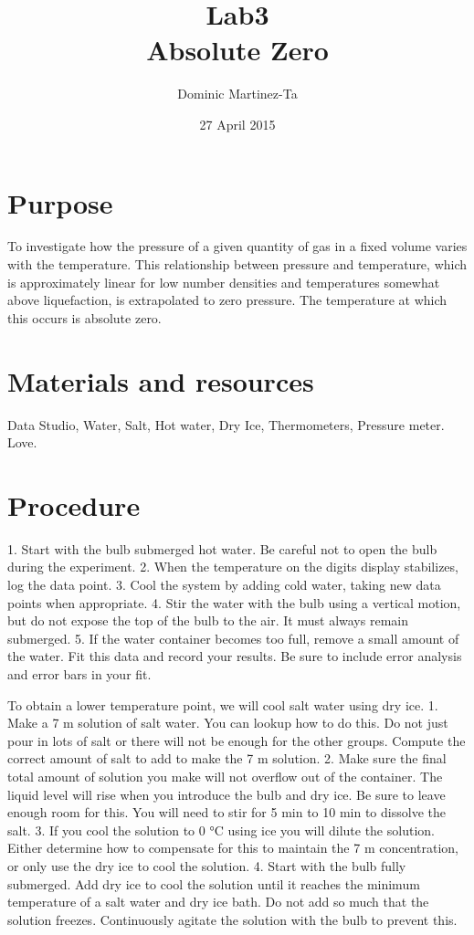 \documentclass[12pt]{report}
\title{Lab3 \\ Absolute Zero}
\author{Dominic Martinez-Ta}
\date{27 April 2015}
\begin{document}
\maketitle


\section{Purpose}
	
	To investigate how the pressure of a given quantity of gas in a fixed volume varies with
the temperature. This relationship between pressure and temperature, which is approximately
linear for low number densities and temperatures somewhat above liquefaction, is
extrapolated to zero pressure. The temperature at which this occurs is absolute zero.

\section {Materials and resources}

Data Studio, Water, Salt, Hot water, Dry Ice, Thermometers, Pressure meter. Love.

\section{Procedure}
	1. Start with the bulb submerged hot water. Be careful not to open the bulb during the experiment.
	2. When the temperature on the digits display stabilizes, log the data point.
	3. Cool the system by adding cold water, taking new data points when appropriate.
	4. Stir the water with the bulb using a vertical motion, but do not expose the top of the bulb to the air. It must always remain submerged.
	5. If the water container becomes too full, remove a small amount of the water.
	Fit this data and record your results. Be sure to include error analysis and error bars in your fit.

	To obtain a lower temperature point, we will cool salt water using dry ice.
	1. Make a 7 m solution of salt water. You can lookup how to do this. Do not just pour in lots of salt or there will not be enough for the other groups. Compute the correct amount of salt to add to make the 7 m solution.
	2. Make sure the final total amount of solution you make will not overflow out of the container. The liquid level will rise when you introduce the bulb and dry ice. Be sure to leave enough room for this. You will need to stir for 5 min to 10 min to dissolve the salt.
	3. If you cool the solution to 0 °C using ice you will dilute the solution. Either determine how to compensate for this to maintain the 7 m concentration, or only use the dry ice to cool the solution.
	4. Start with the bulb fully submerged. Add dry ice to cool the solution until it reaches the minimum temperature of a salt water and dry ice bath. Do not add so much that the solution freezes. Continuously agitate the solution with the bulb to prevent this.
\end{document}

